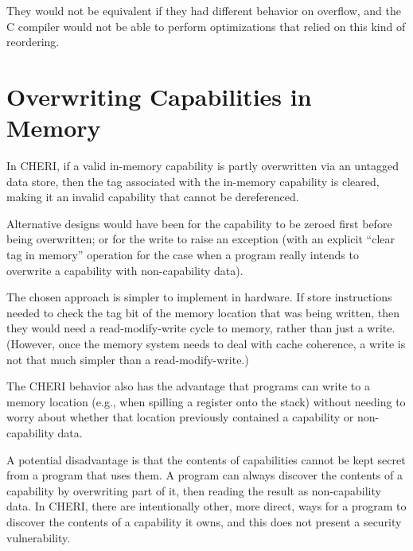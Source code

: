 They would not be equivalent if they had different behavior on overflow, and
the C compiler would not be able to perform optimizations that relied on
this kind of reordering.

\section{Overwriting Capabilities in Memory}

In CHERI, if a valid in-memory capability is partly overwritten via an
untagged data store, then the tag associated with the in-memory capability
is cleared, making it an invalid capability that cannot be dereferenced.

Alternative designs would have been for the capability to be zeroed first
before being overwritten; or for the write to raise an exception (with
an explicit ``clear tag in memory'' operation for the case when a
program really intends to overwrite a capability with non-capability data).

The chosen approach is simpler to
implement in hardware. If store instructions needed to check the tag bit
of the memory location that was being written, then they would need a
read-modify-write cycle to memory, rather than just a write.
(However, once the memory system needs
to deal with cache coherence, a write is not that much simpler than a
read-modify-write.)

The CHERI behavior also has the advantage that programs can write to a
memory location (e.g., when spilling a register onto the stack) without
needing to worry about whether that location previously contained a
capability or non-capability data.

A potential disadvantage is that the contents of capabilities cannot be
kept secret from a program that uses them. A program can always discover
the contents of a capability by overwriting part of it, then reading the
result as non-capability data. In CHERI, there are
intentionally
other, more direct, ways
for a program to discover the contents of a capability it owns, and this
does not present a security vulnerability.

